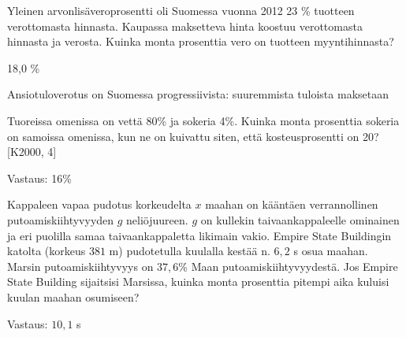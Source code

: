 \begin{tehtava}
Yleinen arvonlisäveroprosentti oli Suomessa vuonna 2012 23 \% tuotteen verottomasta
hinnasta. Kaupassa maksetteva hinta koostuu verottomasta hinnasta
ja verosta. Kuinka monta prosenttia vero on tuotteen
myyntihinnasta?
\begin{vastaus}
18,0 \%
\end{vastaus}
\end{tehtava}

Ansiotuloverotus on Suomessa progressiivista: suuremmista tuloista maksetaan

\begin{tehtava}
    Tuoreissa omenissa on vettä 80\% ja sokeria 4\%. Kuinka monta prosenttia sokeria on samoissa omenissa, kun ne on kuivattu siten, 
    että kosteusprosentti on 20? [K2000, 4]
    
    \begin{vastaus}
        Vastaus: 16\%
    \end{vastaus}
\end{tehtava}

\begin{tehtava}
    Kappaleen vapaa pudotus korkeudelta $x$ maahan on kääntäen verrannollinen putoamiskiihtyvyyden $g$ neliöjuureen. $g$ on kullekin     
    taivaankappaleelle ominainen ja eri puolilla samaa taivaankappaletta likimain vakio. Empire State Buildingin katolta (korkeus 
    $381$ m) pudotetulla kuulalla kestää n. $6,2$ s osua maahan. Marsin putoamiskiihtyvyys on $37,6$\%  Maan putoamiskiihtyvyydestä. 
    Jos Empire State Building sijaitsisi Marsissa, kuinka monta prosenttia pitempi aika kuluisi kuulan maahan osumiseen?

    \begin{vastaus}
        Vastaus: $10,1$ s
    \end{vastaus}
\end{tehtava}

